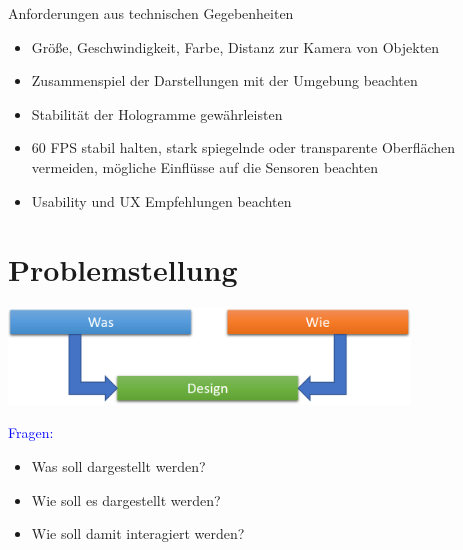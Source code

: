\begin{frame}[fragile]{Anforderungen aus technischen Gegebenheiten}
\begin{itemize}
\item Größe, Geschwindigkeit, Farbe, Distanz zur Kamera von Objekten
\pause
\item Zusammenspiel der Darstellungen mit der Umgebung beachten
\pause
\item Stabilität der Hologramme gewährleisten
\pause
\item 60 FPS stabil halten, stark spiegelnde oder transparente Oberflächen vermeiden, mögliche Einflüsse auf die Sensoren beachten
\pause
\item Usability und UX Empfehlungen beachten
\end{itemize}
\end{frame}


\part{Problemstellung}
\label{part:golas}
\begin{frame}
\vspace{-1em}
\begin{center}
\includegraphics[width=0.8\textwidth]{images/Informiertes_Design.png}	
\end{center}
\textcolor{blue}{Fragen:}
\begin{itemize}
\item Was soll dargestellt werden?
\item Wie soll es dargestellt werden?
\item Wie soll damit interagiert werden?
\end{itemize}
\vspace{50px}
\end{frame}
